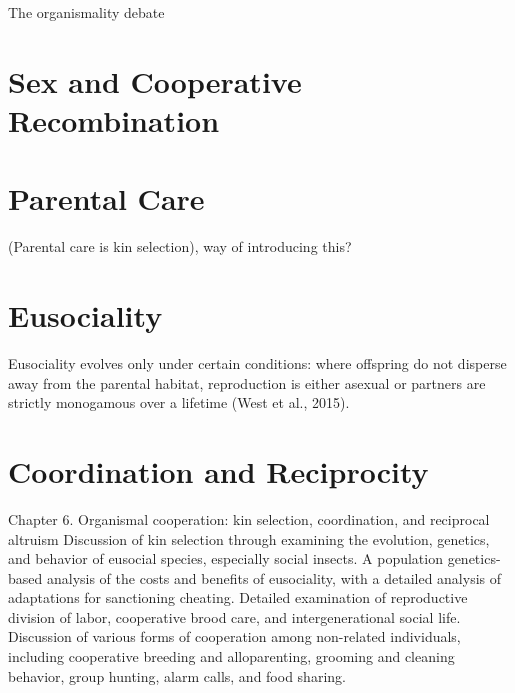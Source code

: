 \documentclass{tufte-book} %
\begin{document}
The organismality debate




\chapter{Sex and Cooperative Recombination}\label{ch:sex}





\chapter{Parental Care}\label{ch:parenting}


(Parental care is kin selection), way of introducing this?





\chapter{Eusociality}\label{ch:eusociality}


Eusociality evolves only under certain conditions: where offspring do not disperse away from the parental habitat, reproduction is either asexual or partners are strictly monogamous over a lifetime (West et al., 2015). 



\chapter{Coordination and Reciprocity}\label{ch:coord-recip}

Chapter 6. Organismal cooperation: kin selection, coordination, and reciprocal altruism
Discussion of kin selection through examining the evolution, genetics, and behavior of eusocial species, especially social insects. A population genetics-based analysis of the costs and benefits of eusociality, with a detailed analysis of adaptations for sanctioning cheating. Detailed examination of reproductive division of labor, cooperative brood care, and intergenerational social life. Discussion of various forms of cooperation among non-related individuals, including cooperative breeding and alloparenting, grooming and cleaning behavior, group hunting, alarm calls, and food sharing. 
\end{document}
